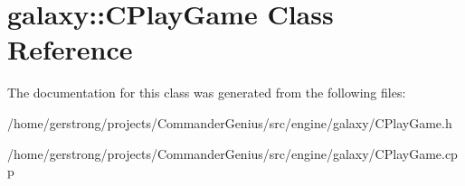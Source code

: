 \hypertarget{classgalaxy_1_1_c_play_game}{
\section{galaxy::CPlayGame Class Reference}
\label{classgalaxy_1_1_c_play_game}
}


The documentation for this class was generated from the following files:\begin{DoxyCompactItemize}
\item 
/home/gerstrong/projects/CommanderGenius/src/engine/galaxy/CPlayGame.h\item 
/home/gerstrong/projects/CommanderGenius/src/engine/galaxy/CPlayGame.cpp\end{DoxyCompactItemize}
